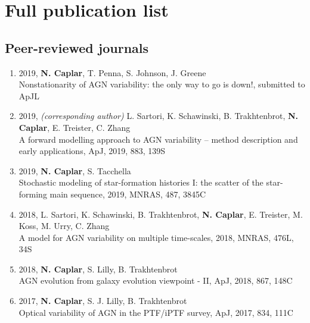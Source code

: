 \documentclass[11pt,letterpaper]{article}
\begin{document}

\newpage 

\section*{Full publication list}


\subsection*{Peer-reviewed journals}

\begin{enumerate}



\item 2019, \textbf{N. Caplar}, T. Penna, S. Johnson, J. Greene \\
Nonstationarity of AGN variability: the only way to go is down!, submitted to ApJL\\

\item 2019, \textit{(corresponding author)} L. Sartori, K. Schawinski, B. Trakhtenbrot, \textbf{N. Caplar}, E. Treister, C. Zhang\\
A forward modelling approach to AGN variability – method
description and early applications, ApJ, 2019, 883, 139S\\

\item 2019, \textbf{N. Caplar}, S. Tacchella \\
Stochastic modeling of star-formation histories I: the scatter of the star-forming main sequence, 2019, MNRAS, 487, 3845C\\


\item 2018, L. Sartori, K. Schawinski, B. Trakhtenbrot, \textbf{N. Caplar}, E. Treister, M. Koss, M. Urry, C. Zhang \\
A model for AGN variability on multiple time-scales, 2018, MNRAS, 476L, 34S\\

\item 2018, \textbf{N. Caplar}, S. Lilly, B. Trakhtenbrot\\
AGN evolution from galaxy evolution viewpoint - II, ApJ, 2018, 867, 148C\\

\item 2017,  \textbf{N. Caplar}, S. J. Lilly, B. Trakhtenbrot   \\Optical variability of AGN in the PTF/iPTF survey, ApJ, 2017, 834, 111C   \\


\end{enumerate}
\end{document}
